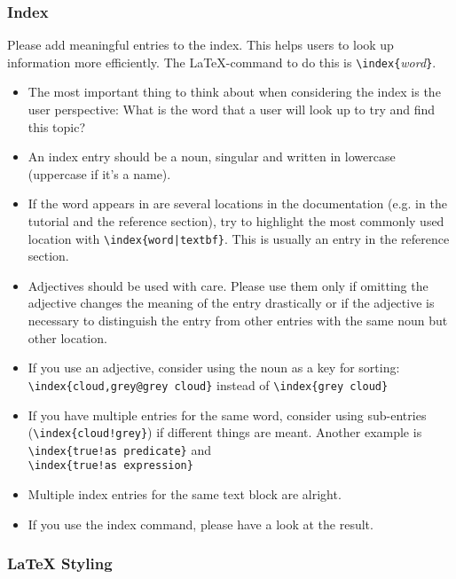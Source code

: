 \subsubsection{Index}
Please add meaningful entries to the index. This helps users to look up information more efficiently.
The \LaTeX-command to do this is \verb#\index{#\textit{word}\verb#}#.
\begin{itemize}
\item The most important thing to think about when considering the index is the user perspective: 
  What is the word that a user will look up to try and find this topic?
\item An index entry should be a noun, singular and written in lowercase (uppercase if it's a name).
\item If the word appears in are several locations in the documentation (e.g. in the tutorial and the
  reference section), try to highlight the most commonly used location with \verb#\index{word|textbf}#.
  This is usually an entry in the reference section.
\item Adjectives should be used with care. 
  Please use them only if omitting the adjective changes the meaning of the entry drastically or
  if the adjective is necessary to distinguish the entry from other entries with the same noun but
  other location.
\item If you use an adjective, consider using the noun as a key for sorting: \verb#\index{cloud,grey@grey cloud}#
  instead of \verb#\index{grey cloud}#
\item If you have multiple entries for the same word, consider using sub-entries (\verb#\index{cloud!grey}#)
  if different things are meant. Another example is \verb#\index{true!as predicate}# and \\ \verb#\index{true!as expression}#
\item Multiple index entries for the same text block are alright.
\item If you use the index command, please have a look at the result.
\end{itemize}

\subsubsection{\LaTeX{} Styling}

